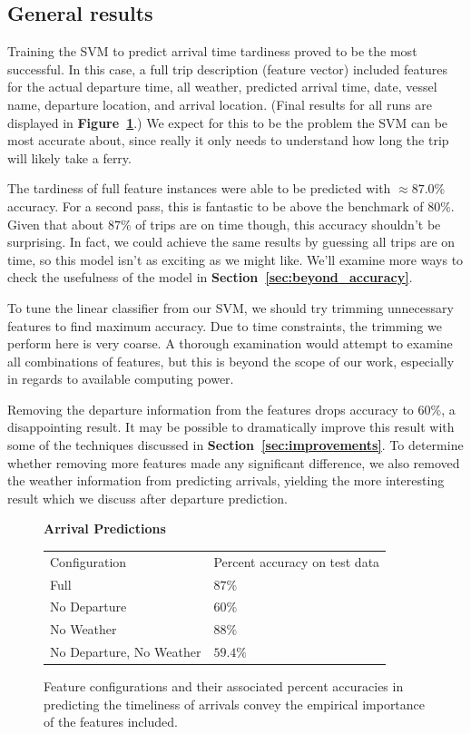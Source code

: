 \documentclass[11pt]{article} %
\begin{document}
\subsection{General results}
\label{sec:gen_results}
Training the SVM to predict arrival time tardiness proved to be the most successful.
In this case, a full trip description (feature vector) included features for the 
actual departure 
time, all weather, predicted arrival time, date, vessel name, departure location, 
and arrival location. (Final results for all runs are displayed in 
\textbf{Figure~\ref{fig:second_run_data_arrivals}}.) We expect for this to 
be the problem the SVM can be most accurate about, since really it only needs to 
understand how long the trip will likely take a ferry. 

The tardiness of full feature instances were able to be predicted with 
$\approx 87.0\%$ accuracy. For a second pass, this is fantastic to be above the
benchmark of $80\%$. Given that about $87\%$ of trips are on time though, this 
accuracy shouldn't be surprising. In fact, we could achieve the same results 
by guessing all trips are on time, so this model isn't as exciting as we might
like. We'll examine more ways to check the usefulness of the model in 
\textbf{Section~\ref{sec:beyond_accuracy}}. 

To tune the linear classifier from our SVM, we should
try trimming unnecessary features to find maximum accuracy. Due to time 
constraints, the trimming we perform here is very coarse. A thorough examination
would attempt to examine all combinations of features, but this is beyond the
scope of our work, especially in regards to available computing power.

Removing the departure information from the features drops accuracy to $60\%$, 
a disappointing result. It may be possible to dramatically improve this result with
some of the techniques discussed in \textbf{Section~\ref{sec:improvements}}.
To determine whether removing more features made any significant difference, we
also removed the weather information from predicting arrivals, yielding 
the more interesting result which we discuss after departure prediction.

\begin{figure}
    \centering
    \textbf{Arrival Predictions}

    \begin{tabular}{ll}
        Configuration & Percent accuracy on test data\\
        Full          & $87\%$\\
        No Departure  & $60\%$\\
        No Weather    & $88\%$\\
        No Departure, No Weather  & $59.4\%$\\
    \end{tabular}
    \caption{Feature configurations and their associated percent accuracies in
         predicting the timeliness of arrivals convey the empirical importance of 
         the features included.}
    \label{fig:second_run_data_arrivals}
\end{figure}
\end{document}
